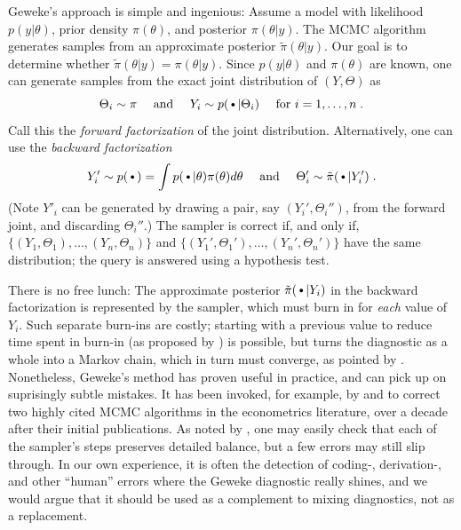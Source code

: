 \documentclass{article}
\newcommand{\argdot}{{\,\vcenter{\hbox{\tiny$\bullet$}}\,}}%
\begin{document}
Geweke's approach is simple and ingenious:
Assume a model with 
likelihood $p(y|\theta)$, prior density $\pi(\theta)$, and posterior
$\pi(\theta|y)$. The MCMC algorithm generates samples from an
approximate posterior $\tilde{\pi}(\theta|y)$. Our goal is to 
determine whether $\tilde{\pi}(\theta|y)=\pi(\theta|y)$. 
Since $p(y|\theta)$ and $\pi(\theta)$ are known, one can generate
samples from the exact joint distribution of $(Y,\Theta)$ as
\begin{equation}
  \Theta_i\sim \pi
  \quad\text{ and }\quad
  Y_i\sim p(\argdot|\Theta_i)\quad\text{ for }i=1,\ldots,n\;.
  \label{eq:ancestralsampling}
\end{equation}
Call this the \emph{forward factorization} of the joint distribution.
Alternatively, one can use the \emph{backward factorization}
\begin{equation*}
  Y'_i\sim p(\argdot)=\int p(\argdot|\theta)\pi(\theta)d\theta
  \quad\text{ and }\quad
  \Theta'_i\sim\tilde{\pi}(\argdot|Y'_i)\;.
\end{equation*}
(Note $Y'_i$ can be generated by drawing a pair, say $(Y_i',\Theta_i'')$, from the forward joint,
and discarding $\Theta_i''$.) The sampler is correct if, and only if, $\{(Y_1,\Theta_1),\ldots,(Y_n,\Theta_n)\}$
and $\{(Y_1',\Theta_1'),\ldots,(Y_n',\Theta_n')\}$ have the same distribution; 
the query is answered using a hypothesis test.

There is no free lunch: The approximate posterior
$\tilde{\pi}(\argdot|Y_i)$ in the backward factorization
is represented by the sampler, which must burn in for \emph{each}
value of $Y_i$. Such separate burn-ins are costly; starting with a previous value to reduce time spent in burn-in (as proposed by \cite{geweke_getting_2004}) is possible, 
but turns the diagnostic as a whole into a Markov chain,
 which in turn must converge, as pointed by \citet{talts_validating_2018}.
Nonetheless, Geweke's method has proven useful in practice, and can pick up
on suprisingly subtle mistakes.
It has been invoked, for example, by \citet{del_negro_time_2015} and
\citet{karlsson_corrigendum_2017} to correct two highly cited MCMC
algorithms in the econometrics literature, over a decade after their
initial publications.
As noted by \citet{grosse_testing_2014}, one may easily check that each of the sampler's steps preserves detailed balance, but a few errors may still slip through. 
In our own experience, it is often the detection of coding-,
derivation-, and other ``human'' errors where the Geweke diagnostic really
shines, and we would argue that it should be used as a complement to
mixing diagnostics, not as a replacement.
\end{document}
